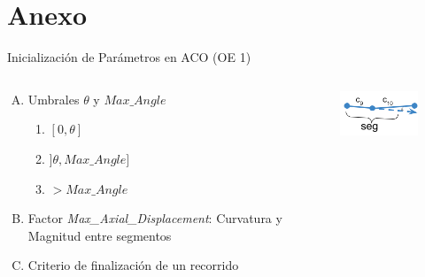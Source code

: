 \section{Anexo}

\begin{frame}{Inicializaci\'on de Par\'ametros en ACO (OE 1)}
    \begin{columns}
        \hspace{-1cm}
        \begin{column}{0.4\textwidth}
            \begin{enumerate}[A)] \fontsize{10pt}{5}\selectfont
                \item Umbrales $\theta$ y $Max\_Angle$ 
                \begin{enumerate}[1]\fontsize{10pt}{5}\selectfont
                    \item $[0, \theta]$
                    \item $]\theta, Max\_Angle]$
                    \item $ > Max\_Angle$
                \end{enumerate}
                \item Factor {\it Max\_Axial\_Displacement}: Curvatura y Magnitud entre segmentos
                \item Criterio de finalizaci\'on de un recorrido
            \end{enumerate}
        \end{column}
        \begin{column}{0.25\textwidth}
            \centering
            \begin{figure}
                \includegraphics[scale=0.55]{Pictures/ant-params-1.png}

\end{figure}
\end{column}
\end{columns}
\end{frame}
